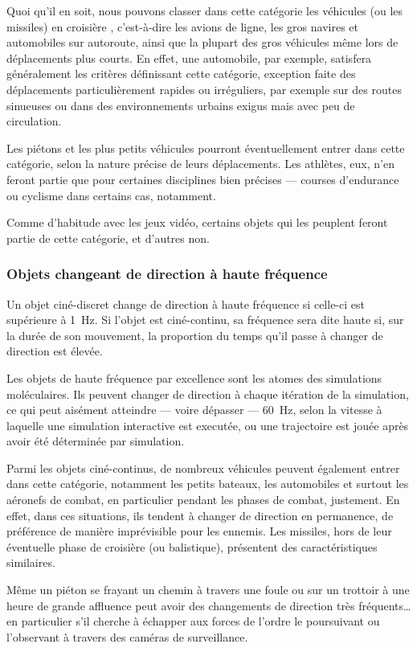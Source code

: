 	Quoi qu'il en soit, nous pouvons classer dans cette catégorie les véhicules (ou les missiles) \og en croisière \fg{}, c'est-à-dire les avions de ligne, les gros navires et automobiles sur autoroute, ainsi que la plupart des gros véhicules même lors de déplacements plus courts. En effet, une automobile, par exemple, satisfera généralement les critères définissant cette catégorie, exception faite des déplacements particulièrement rapides ou irréguliers, par exemple sur des routes sinueuses ou dans des environnements urbains exigus mais avec peu de circulation.
	
	Les piétons et les plus petits véhicules pourront éventuellement entrer dans cette catégorie, selon la nature précise de leurs déplacements. Les athlètes, eux, n'en feront partie que pour certaines disciplines bien précises --- courses d'endurance ou cyclisme dans certains cas, notamment.
	
	Comme d'habitude avec les jeux vidéo, certains objets qui les peuplent feront partie de cette catégorie, et d'autres non.
	
	\subsubsection{Objets changeant de direction à haute fréquence}
	Un objet ciné-discret change de direction à haute fréquence si celle-ci est supérieure à 1~Hz. Si l'objet est ciné-continu, sa fréquence sera dite haute si, sur la durée de son mouvement, la proportion du temps qu'il passe à changer de direction est élevée.
	
	Les objets de haute fréquence par excellence sont les atomes des simulations moléculaires. Ils peuvent changer de direction à chaque itération de la simulation, ce qui peut aisément atteindre --- voire dépasser --- 60~Hz, selon la vitesse à laquelle une simulation interactive est executée, ou une trajectoire est jouée après avoir été déterminée par simulation.
	
	Parmi les objets ciné-continus, de nombreux véhicules peuvent également entrer dans cette catégorie, notamment les petits bateaux, les automobiles et surtout les aéronefs de combat, en particulier pendant les phases de combat, justement. En effet, dans ces situations, ils tendent à changer de direction en permanence, de préférence de manière imprévisible pour les ennemis. Les missiles, hors de leur éventuelle phase de croisière (ou balistique), présentent des caractéristiques similaires.
	
	Même un piéton se frayant un chemin à travers une foule ou sur un trottoir à une heure de grande affluence peut avoir des changements de direction très fréquents\ldots{} en particulier s'il cherche à échapper aux forces de l'ordre le poursuivant ou l'observant à travers des caméras de surveillance.
	
